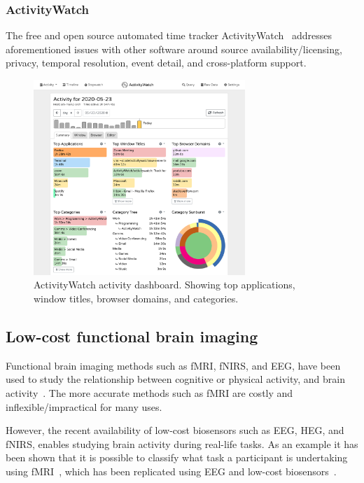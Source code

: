 \documentclass{IEEEtran}
\begin{document}
\subsubsection{ActivityWatch}

The free and open source automated time tracker ActivityWatch~\cite{bjareholt_activitywatch_nodate} addresses aforementioned issues with other software around source availability/licensing, privacy, temporal resolution, event detail, and cross-platform support.

\begin{figure}[h]
\centering
\includegraphics[width=8cm]{img/screenshot-aw-activity.png}
\caption{ActivityWatch activity dashboard. Showing top applications, window titles, browser domains, and categories.}\label{fig:aw}
\end{figure}


\subsection{Low-cost functional brain imaging}

Functional brain imaging methods such as fMRI, fNIRS, and EEG, have been used to study the relationship between cognitive or physical activity, and brain activity~\cite{floyd_decoding_2017}\cite{hong_classification_2015}\cite{fucci_replication_2019}. The more accurate methods such as fMRI are costly and inflexible/impractical for many uses.

However, the recent availability of low-cost biosensors such as EEG, HEG, and fNIRS, enables studying brain activity during real-life tasks. As an example it has been shown that it is possible to classify what task a participant is undertaking using fMRI~\cite{floyd_decoding_2017}, which has been replicated using EEG and low-cost biosensors~\cite{fucci_replication_2019}.
\end{document}
